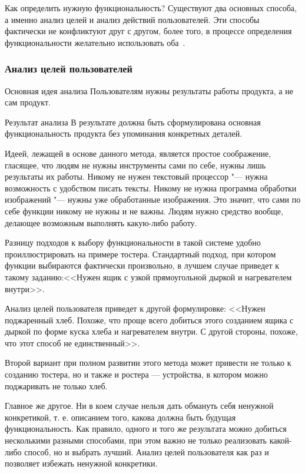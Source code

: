 \documentclass{../industrial-development}
\begin{document}
Как определить нужную функциональность? Существуют два основных способа, а именно анализ целей и анализ действий пользователей. Эти способы фактически не конфликтуют друг с другом, более того, в процессе определения функциональности желательно использовать оба~\cite[с.~111--112]{Golovach}.

\begin{frame} \frametitle{Анализ целей пользователей}
  \begin{block}{Основная идея анализа}
    Пользователям нужны результаты работы продукта, а не сам продукт.
  \end{block}
  \begin{block}{Результат анализа}
    В результате должна быть сформулирована основная функциональность продукта без упоминания конкретных деталей.
  \end{block}
\end{frame}

\lecturenotes

Идеей, лежащей в основе данного метода, является простое соображение, гласящее, что людям не нужны инструменты сами по себе, нужны лишь результаты их работы. Никому не нужен текстовый процессор "--- нужна возможность с удобством писать тексты. Никому не нужна программа обработки изображений "--- нужны уже обработанные изображения. Это значит, что сами по себе функции никому не нужны и не важны. Людям нужно средство вообще, делающее возможным выполнять какую-либо работу.

Разницу подходов к выбору функциональности в такой системе удобно проиллюстрировать на примере тостера. Стандартный подход, при котором функции выбираются фактически произвольно, в лучшем случае приведет к такому заданию:<<Нужен ящик с узкой прямоугольной дыркой и нагревателем внутри>>.

Анализ целей пользователя приведет к другой формулировке: <<Нужен поджаренный хлеб. Похоже, что проще всего добиться этого созданием ящика с дыркой по форме куска хлеба и нагревателем внутри. С другой стороны, похоже, что этот способ не единственный>>.

Второй вариант при полном развитии этого метода может привести не только к созданию тостера, но и также и ростера --- устройства, в котором можно поджаривать не только хлеб.

Главное же другое. Ни в коем случае нельзя дать обмануть себя ненужной конкретикой, т. е. описанием того, какова должна быть будущая функциональность. Как правило, одного и того же результата можно добиться несколькими разными способами, при этом важно не только реализовать какой-либо способ, но и выбрать лучший. Анализ целей пользователя как раз и позволяет избежать ненужной конкретики.
\end{document}
